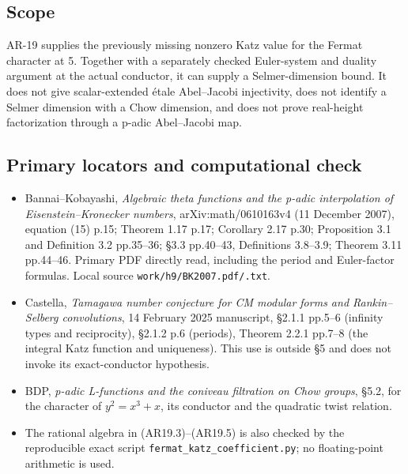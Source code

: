\subsection{Scope}\label{scope}

AR-19 supplies the previously missing nonzero Katz value for the Fermat
character at 5. Together with a separately checked Euler-system and
duality argument at the actual conductor, it can supply a
Selmer-dimension bound. It does not give scalar-extended étale
Abel--Jacobi injectivity, does not identify a Selmer dimension with a
Chow dimension, and does not prove real-height factorization through a
p-adic Abel--Jacobi map.

\subsection{Primary locators and computational
check}\label{primary-locators-and-computational-check}

\begin{itemize}
\tightlist
\item
  Bannai--Kobayashi, \emph{Algebraic theta functions and the p-adic
  interpolation of Eisenstein--Kronecker numbers}, arXiv:math/0610163v4
  (11 December 2007), equation (15) p.15; Theorem 1.17 p.17; Corollary
  2.17 p.30; Proposition 3.1 and Definition 3.2 pp.35--36; §3.3
  pp.40--43, Definitions 3.8--3.9; Theorem 3.11 pp.44--46. Primary PDF
  directly read, including the period and Euler-factor formulas. Local
  source \texttt{work/h9/BK2007.pdf/.txt}.
\item
  Castella, \emph{Tamagawa number conjecture for CM modular forms and
  Rankin--Selberg convolutions}, 14 February 2025 manuscript, §2.1.1
  pp.5--6 (infinity types and reciprocity), §2.1.2 p.6 (periods),
  Theorem 2.2.1 pp.7--8 (the integral Katz function and uniqueness).
  This use is outside §5 and does not invoke its exact-conductor
  hypothesis.
\item
  BDP, \emph{p-adic L-functions and the coniveau filtration on Chow
  groups}, §5.2, for the character of \(y^2=x^3+x\), its conductor and
  the quadratic twist relation.
\item
  The rational algebra in (AR19.3)--(AR19.5) is also checked by the
  reproducible exact script \texttt{fermat\_katz\_coefficient.py}; no
  floating-point arithmetic is used.
\end{itemize}
